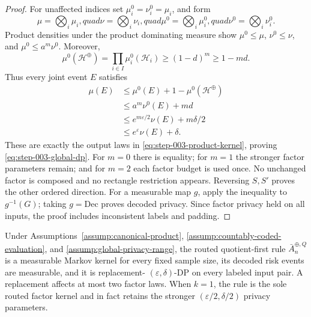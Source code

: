 \begin{proof}
For unaffected indices set \(\mu_i^0=\nu_i^0=\mu_i\), and form
\begin{equation}\label{eq:step-003-product-submeasures}
\mu=\bigotimes_i\mu_i,quad \nu=\bigotimes_i\nu_i,quad
\mu^0=\bigotimes_i\mu_i^0,quad \nu^0=\bigotimes_i\nu_i^0.
\end{equation}
Product densities under the product dominating measure show
\(\mu^0\le\mu\), \(\nu^0\le\nu\), and
\(\mu^0\le a^m\nu^0\).  Moreover,
\begin{equation}\label{eq:step-003-product-retained-mass}
\mu^0(\mathcal H^{\oplus})
=\prod_{i\in I}\mu_i^0(\mathcal H_i)
\ge(1-d)^m\ge1-md.
\end{equation}
Thus every joint event \(E\) satisfies
\begin{equation}\label{eq:step-003-composition-chain}
\begin{split}
\mu(E)
&\le\mu^0(E)+1-\mu^0(\mathcal H^{\oplus})\\
&\le a^m\nu^0(E)+md\\
&\le e^{m\varepsilon/2}\nu(E)+m\delta/2\\
&\le e^\varepsilon\nu(E)+\delta.
\end{split}
\end{equation}
These are exactly the output laws in
\eqref{eq:step-003-product-kernel}, proving
\eqref{eq:step-003-global-dp}.  For \(m=0\) there is equality; for \(m=1\)
the stronger factor parameters remain; and for \(m=2\) each factor budget
is used once.  No unchanged factor is composed and no rectangle restriction
appears.  Reversing \(S,S'\) proves the other ordered direction.  For a
measurable map \(g\), apply the inequality to \(g^{-1}(G)\); taking
\(g=\mathrm{Dec}\) proves decoded privacy.  Since factor privacy held on all
inputs, the proof includes inconsistent labels and padding.
\end{proof}

\begin{proposition}
\label{prop:step-003-global-kernel-certificate}
Under Assumptions~\ref{assump:canonical-product},
\ref{assump:countably-coded-evaluation}, and
\ref{assump:global-privacy-range}, the routed quotient-first rule
\(\bar A_n^{\oplus,Q}\) is a measurable Markov kernel for every fixed
sample size, its decoded risk events are measurable, and it is replacement-
\((\varepsilon,\delta)\)-DP on every labeled input pair.  A replacement
affects at most two factor laws.  When \(k=1\), the rule is the sole routed
factor kernel and in fact retains the stronger
\((\varepsilon/2,\delta/2)\) privacy parameters.
\end{proposition}

